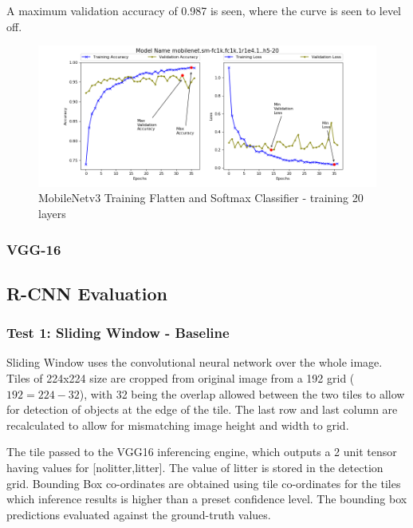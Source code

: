 \documentclass{IEEEtran}
\begin{document}
\begin{enumerate}
A maximum validation accuracy of 0.987 is seen, where the curve is seen to level off. 

\begin{figure}[H]
\centering
\label{fig:mob3-3}
\includegraphics[scale=0.6]{images/mob3-3.png}
\caption{MobileNetv3 Training Flatten and Softmax Classifier - training 20 layers}
\end{figure}


\end{enumerate}


\subsubsection{VGG-16}

\subsection{R-CNN Evaluation}

\subsubsection{Test 1: Sliding Window - Baseline}

Sliding Window uses the convolutional neural network over the whole image. Tiles of 224x224 size are cropped from original image from a 192 grid ($192 = 224-32$), with 32 being the overlap allowed between the two tiles to allow for detection of objects at the edge of the tile. The last row and last column are recalculated to allow for mismatching image height and width to grid. \newline

The tile passed to the VGG16 inferencing engine, which outputs a 2 unit tensor having values for [nolitter,litter]. The value of litter is stored in the detection grid. Bounding Box co-ordinates are obtained using tile co-ordinates for the tiles which inference results is higher than a preset confidence level. The bounding box predictions evaluated against the ground-truth values.\newline
\end{document}

